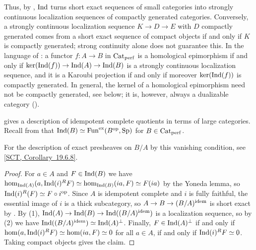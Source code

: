 	Thus, by , $\operatorname{Ind}$ turns short exact sequences of small categories into strongly continuous localization sequences of compactly generated categories. Conversely, a strongly continuous localization sequence $K \to D \to E$ with $D$ compactly generated comes from a short exact sequence of compact objects if and only if $K$ is compactly generated; strong continuity alone does not guarantee this. In the language of : a functor $f\colon A \to B$ in ${\textup{Cat}}_{\operatorname{perf}}$ is a homological epimorphism if and only if $\ker(\operatorname{Ind}(f)) \to \operatorname{Ind}(A) \to \operatorname{Ind}(B)$ is a strongly continuous localization sequence, and it is a Karoubi projection if and only if moreover $\ker(\operatorname{Ind}(f))$ is compactly generated. In general, the kernel of a homological epimorphism need not be compactly generated, see  below; it is, however, always a dualizable category ().

	 gives a description of idempotent complete quotients in terms of large categories. Recall from  that $\operatorname{Ind}(B) \simeq \operatorname{Fun}^{\operatorname{ex}}(B^{\textup{op}},{\textup{Sp}})$ for $B \in {\textup{Cat}}_{\operatorname{perf}}$.


	For the description of exact presheaves on $B/A$ by this vanishing condition, see \href{https://animarium.org/tag/1155/}{[SCT, Corollary~19.6.8]}.

	\begin{proof}
		For $a \in A$ and $F \in \operatorname{Ind}(B)$ we have $\hom_{\operatorname{Ind}(A)}(a,\operatorname{Ind}(i)^RF) \simeq \hom_{\operatorname{Ind}(B)}(ia,F) \simeq F(ia)$ by the Yoneda lemma, so $\operatorname{Ind}(i)^R(F) \simeq F \circ i^{\textup{op}}$. Since $A$ is idempotent complete and $i$ is fully faithful, the essential image of $i$ is a thick subcategory, so $A \to B \to (B/A)^{\operatorname{idem}}$ is short exact by . By (1), $\operatorname{Ind}(A) \to \operatorname{Ind}(B) \to \operatorname{Ind}((B/A)^{\operatorname{idem}})$ is a localization sequence, so by (2) we have $\operatorname{Ind}((B/A)^{\operatorname{idem}}) \simeq \operatorname{Ind}(A)^{\perp}$. Finally, $F \in \operatorname{Ind}(A)^{\perp}$ if and only if $\hom(a,\operatorname{Ind}(i)^RF) \simeq \hom(ia,F) \simeq 0$ for all $a \in A$, if and only if $\operatorname{Ind}(i)^RF \simeq 0$. Taking compact objects gives the claim.
	\end{proof}


